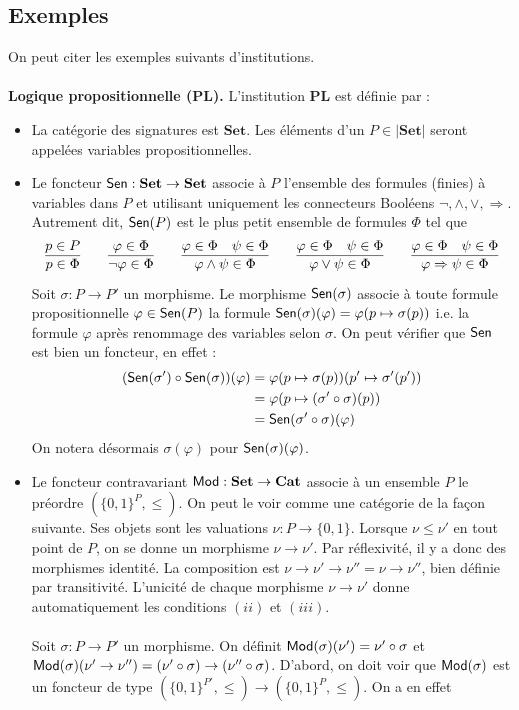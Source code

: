 \documentclass[11pt,a4paper]{report}
\newcommand{\ph}{\varphi}
\newcommand{\itemz}{\item[$\triangleright$]}
\newcommand{\gr}{\textbf}
\newcommand{\info}[1]{\text{{\fontfamily{lmss}\selectfont #1}}}
\newcommand{\Mod}{\info{Mod}}
\newcommand{\Sen}{\info{Sen}}
\newcommand{\1}{\mathbbm{1}}
\begin{document}
\subsection{Exemples}
On peut citer les exemples suivants d'institutions.\\\\
\gr{Logique propositionnelle ($\gr{PL}$).} L'institution $\gr{PL}$ est définie par :
\begin{itemize}
\itemz La catégorie des signatures est $\gr{Set}$. Les éléments d'un $P \in |\gr{Set}|$ seront appelées variables propositionnelles.
\itemz Le foncteur $\Sen : \gr{Set} \to \gr{Set}$ associe à $P$ l'ensemble des formules (finies) à variables dans $P$ et utilisant uniquement les connecteurs Booléens $\neg, \wedge, \vee, \Rightarrow$. Autrement dit, $\Sen(P)$ est le plus petit ensemble de formules $\Phi$ tel que
$$
\infer{p \in \Phi}{p \in P}
\qquad
\infer{\neg \ph \in \Phi}{\ph \in \Phi}
\qquad
\infer{\ph \wedge \psi \in \Phi}{\ph \in \Phi & \psi \in \Phi }
\qquad
\infer{\ph \vee \psi \in \Phi}{\ph \in \Phi & \psi \in \Phi }
\qquad
\infer{\ph \Rightarrow \psi \in \Phi}{\ph \in \Phi & \psi \in \Phi }
$$
Soit $\sigma : P \to P'$ un morphisme. Le morphisme $\Sen(\sigma)$ associe à toute formule propositionnelle $\ph \in \Sen(P)$ la formule $\Sen(\sigma)(\ph) = \ph(p \mapsto \sigma(p))$ i.e. la formule $\ph$ après renommage des variables selon $\sigma$. On peut vérifier que $\Sen$ est bien un foncteur, en effet :
\begin{align*}
 (\Sen(\sigma') \circ \Sen(\sigma)) (\ph) & = \ph(p \mapsto \sigma(p))(p' \mapsto \sigma'(p')) \\ & = \ph(p \mapsto (\sigma' \circ \sigma)(p)) \\ & = \Sen(\sigma' \circ \sigma)(\ph) 
 \end{align*}
On notera désormais $\sigma(\ph)$ pour $\Sen(\sigma)(\ph)$.
\itemz Le foncteur contravariant $\Mod : \gr{Set} \to \gr{Cat}$ associe à un ensemble $P$ le préordre $(\{0,1\}^P, \leq)$. On peut le voir comme une catégorie de la façon suivante. Ses objets sont les valuations $\nu : P \to \{0,1\}$. Lorsque $\nu \leq \nu'$ en tout point de $P$, on se donne un morphisme $\nu \to \nu'$. Par réflexivité, il y a donc des morphismes identité. La composition est $\nu \to \nu' \to \nu'' = \nu \to \nu''$, bien définie par transitivité. L'unicité de chaque morphisme $\nu \to \nu'$ donne automatiquement les conditions $(ii)$ et $(iii)$.\\\\
Soit $\sigma : P \to P'$ un morphisme. On définit $\Mod(\sigma)(\nu') = \nu' \circ \sigma$ et $\Mod(\sigma)(\nu' \to \nu'') = (\nu' \circ \sigma) \to (\nu'' \circ \sigma)$. D'abord, on doit voir que $\Mod(\sigma)$ est un foncteur de type $(\{0,1\}^{P'}, \leq) \to (\{0,1\}^P,\leq)$. On a en effet

\end{itemize}
\end{document}
